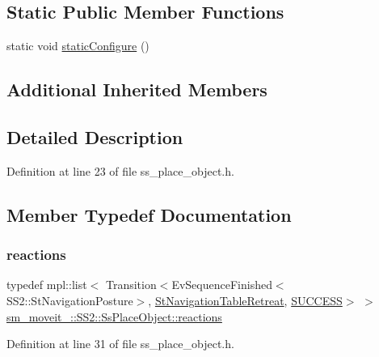 \subsection*{Static Public Member Functions}
\begin{DoxyCompactItemize}
\item 
static void \hyperlink{structsm__moveit__4_1_1SS2_1_1SsPlaceObject_ad5e0cd7fc79448446fcfa5a1b3a5a35d}{static\+Configure} ()
\end{DoxyCompactItemize}
\subsection*{Additional Inherited Members}


\subsection{Detailed Description}


Definition at line 23 of file ss\+\_\+place\+\_\+object.\+h.



\subsection{Member Typedef Documentation}
\mbox{\label{structsm__moveit__4_1_1SS2_1_1SsPlaceObject_a51693005763762aec9f908f0a624ee87}} 
\subsubsection{\texorpdfstring{reactions}{reactions}}
{\footnotesize\ttfamily typedef mpl\+::list$<$ Transition$<$Ev\+Sequence\+Finished$<$S\+S2\+::\+St\+Navigation\+Posture$>$, \hyperlink{structsm__moveit__4_1_1StNavigationTableRetreat}{St\+Navigation\+Table\+Retreat}, \hyperlink{classSUCCESS}{S\+U\+C\+C\+E\+SS}$>$ $>$ \hyperlink{structsm__moveit__4_1_1SS2_1_1SsPlaceObject_a51693005763762aec9f908f0a624ee87}{sm\+\_\+moveit\+\_\+::\+S\+S2\+::\+Ss\+Place\+Object\+::reactions}}



Definition at line 31 of file ss\+\_\+place\+\_\+object.\+h.



